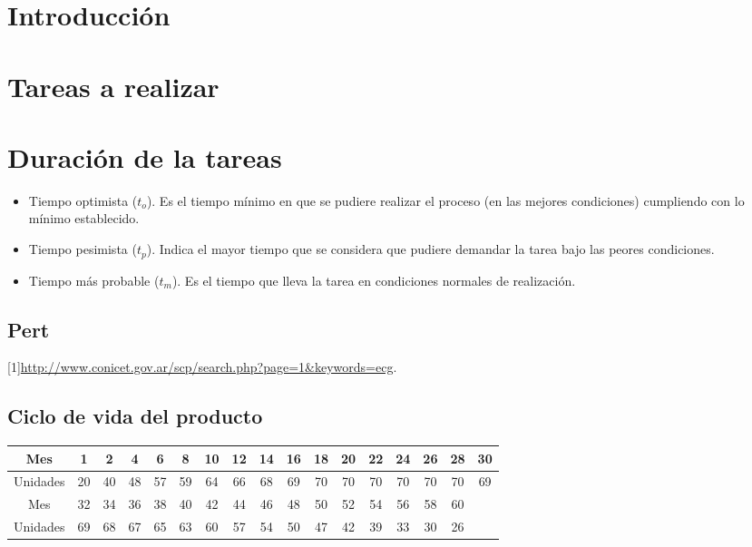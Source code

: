\documentclass[12pt]{article}
\numberwithin{equation}{section}
\numberwithin{figure}{section}
\numberwithin{table}{section}
\begin{document}
\section{Introducción}

\section{Tareas a realizar}

\section{Duración de la tareas}

\begin{itemize}
\item Tiempo optimista ($t_o$). Es el tiempo mínimo en que se pudiere realizar
  el proceso (en las mejores condiciones) cumpliendo con lo mínimo establecido.
\item Tiempo pesimista ($t_p$). Indica el mayor tiempo que se considera que
  pudiere demandar la tarea bajo las peores condiciones.
\item Tiempo más probable ($t_m$). Es el tiempo que lleva la tarea en
  condiciones normales de realización.
\end{itemize}


\subsection{Pert}


[1]\href{http://www.conicet.gov.ar/scp/search.php?page=1&keywords=ecg}{http://www.conicet.gov.ar/scp/search.php?page=1\&keywords=ecg}.

\subsection{Ciclo de vida del producto}


\begin{tabular}{c | c | c | c | c | c | c | c | c | c | c | c | c | c | c | c | c | }
   Mes & 1 & 2 & 4 & 6 & 8 & 10 & 12 & 14 & 16 & 18 & 20 & 22 & 24 & 26 & 28 & 30\\
   \hline
   Unidades & 20 & 40 & 48 & 57 & 59 & 64 & 66 & 68 & 69 & 70 & 70 & 70 & 70 & 70 & 70 & 69\\
	\hline
   Mes  & 32 & 34 & 36 & 38 & 40 & 42 & 44 & 46 & 48 & 50 & 52 & 54 & 56 & 58 & 60 \\
	\hline
   Unidades  & 69 & 68 & 67 & 65 & 63 & 60 & 57 & 54 & 50 & 47 & 42 & 39 & 33 & 30 & 26 \\
\end{tabular}
\end{document}
